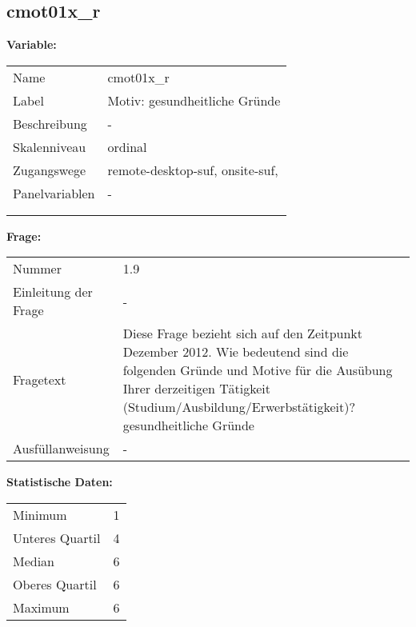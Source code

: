 	
	
	\subsection{cmot01x\_r}
	\label{subSection:cmot01x_r}

	\noindent\textbf{Variable:}\\
		\begin{tabular}{lL{11.3cm}}
			\label{tableVariable:cmot01x_r}
			Name & cmot01x\_r \\
			Label & Motiv: gesundheitliche Gründe \\
			Beschreibung & - \\
			Skalenniveau & ordinal \\
			Zugangswege &
				remote-desktop-suf,
				onsite-suf,
 \\
			Panelvariablen & -
			 \\
			 \\
 \\
		\end{tabular}

		\vspace*{1 cm}
		\noindent\textbf{Frage:}\\
		\begin{tabular}{lL{11.3cm}}
			\label{tableQuestion:cmot01x_r}
			Nummer & 1.9 \\
			Einleitung der Frage & - \\
			Fragetext & Diese Frage bezieht sich auf den Zeitpunkt Dezember 2012. Wie bedeutend sind die folgenden Gründe und Motive für die Ausübung Ihrer derzeitigen Tätigkeit (Studium/Ausbildung/Erwerbstätigkeit)?
gesundheitliche Gründe \\
			Ausfüllanweisung & - \\
		\end{tabular}


		\vspace*{1 cm}
		\noindent\textbf{Statistische Daten:}\\
			\begin{tabular}{ll}
				\label{tableStatistics:cmot01x_r}
					Minimum & 1 \\
					Unteres Quartil & 4 \\
					Median & 6 \\
					Oberes Quartil & 6 \\
					Maximum & 6 \\
			\end{tabular}



